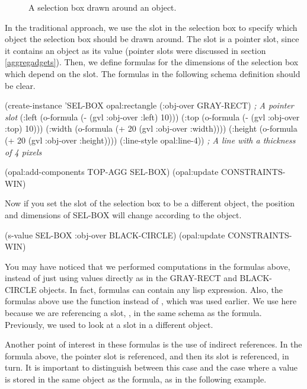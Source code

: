 \begin{figure}
\begin{center}
\end{center}
\caption{A selection box drawn around an object.}
\end{figure}

In the traditional approach, we use the slot  in the
selection box to specify which object the selection box should be
drawn around.  The  slot is a pointer slot, since it
contains an object as its value (pointer slots were discussed in
section \ref{aggregadgets}).  Then, we define formulas for the
dimensions of the selection box which depend on the 
slot.  The formulas in the following schema definition should be clear.

\begin{programexample}
(create-instance 'SEL-BOX opal:rectangle
   (:obj-over GRAY-RECT)  {\it ; A pointer slot}
   (:left (o-formula (- (gvl :obj-over :left) 10)))
   (:top (o-formula (- (gvl :obj-over :top) 10)))
   (:width (o-formula (+ 20 (gvl :obj-over :width))))
   (:height (o-formula (+ 20 (gvl :obj-over :height))))
   (:line-style opal:line-4))  {\it ; A line with a thickness of 4 pixels}
		
(opal:add-components TOP-AGG SEL-BOX)
(opal:update CONSTRAINTS-WIN)
\end{programexample}

Now if you set the  slot of the selection box to be a
different object, the position and dimensions of SEL-BOX will change
according to the object.

\begin{programexample}
(s-value SEL-BOX :obj-over BLACK-CIRCLE)
(opal:update CONSTRAINTS-WIN)
\end{programexample}

You may have noticed that we performed computations in the formulas
above, instead of just using values directly as in the GRAY-RECT and
BLACK-CIRCLE objects.  In fact, formulas can contain any lisp
expression.  Also, the formulas above use the function 
instead of , which was used earlier.  We use  here
because we are referencing a slot, , in the same schema
as the formula.  Previously, we used  to look at a slot in a
different object.

Another point of interest in these formulas is the use of indirect
references.  In the  formula above, the pointer slot 
is referenced, and then its  slot is referenced, in turn.
It is important to distinguish between this case and the case where
a value is stored in the same object as the formula, as in the
following example.

